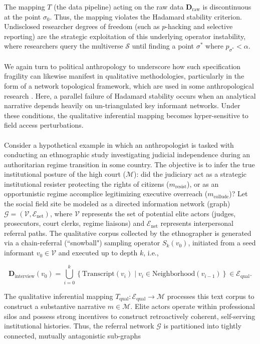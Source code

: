 \documentclass{article}
\theoremstyle{definition}
\begin{document}
\noindent
The mapping $T$ (the data pipeline) acting on the raw data \(\mathbf{D}_{\text{raw}}\) is discontinuous at the point $\sigma_0$. Thus, the mapping violates the Hadamard stability criterion. Undisclosed researcher degrees of freedom (such as $p$-hacking and selective reporting) are the strategic exploitation of this underlying operator instability, where researchers query the multiverse $\mathcal{S}$ until finding a point $\sigma^*$ where $p_{\sigma^*} < \alpha$. \\
\\
We again turn to political anthropology to underscore how such specification fragility can likewise manifest in qualitative methodologies, particularly in the form of a network topological framework, which are used in some anthropological research \cite{Wol78}. Here, a parallel failure of Hadamard stability occurs when an analytical narrative depends heavily on un-triangulated key informant networks. Under these conditions, the qualitative inferential mapping becomes hyper-sensitive to field access perturbations. \\
\\
Consider a hypothetical example in which an anthropologist is tasked with conducting an ethnographic study investigating judicial independence during an authoritarian regime transition in some country. The objective is to infer the true institutional posture of the high court ($\mathcal{M}$): did the judiciary act as a strategic institutional resister protecting the rights of citizens ($m_{\text{resist}}$), or as an opportunistic regime accomplice legitimizing executive overreach ($m_{\text{collude}}$)? Let the social field site be modeled as a directed information network (graph) $\mathcal{G} = (\mathcal{V}, \mathcal{E}_{\text{net}})$, where $\mathcal{V}$ represents the set of potential elite actors (judges, prosecutors, court clerks, regime liaisons) and $\mathcal{E}_{\text{net}}$ represents interpersonal referral paths. The qualitative corpus collected by the ethnographer is generated via a chain-referral (``snowball") sampling operator $S_k(v_0)$, initiated from a seed informant $v_0 \in \mathcal{V}$ and executed up to depth $k$, i.e., 

\begin{equation}
\mathbf{D}_{\text{interview}}(v_0) = \bigcup_{i=0}^k \left\{ \text{Transcript}(v_i) \mid v_i \in \text{Neighborhood}(v_{i-1}) \right\} \in \mathcal{E}_{\text{qual}}.
\end{equation}

\noindent
The qualitative inferential mapping $T_{\text{qual}}: \mathcal{E}_{\text{qual}} \to \mathcal{M}$ processes this text corpus to construct a substantive narrative $m \in \mathcal{M}$. Elite actors operate within professional silos and possess strong incentives to construct retroactively coherent, self-serving institutional histories. Thus, the referral network $\mathcal{G}$ is partitioned into tightly connected, mutually antagonistic sub-graphs
\end{document}
